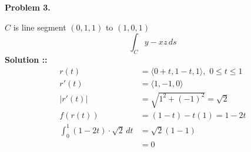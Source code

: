 \documentclass[11pt]{article}
\begin{document}

\textbf{Problem 3.}

$C$ is line segment $(0,1,1)$ to $(1,0,1)$
$$\int_C y-xz\,ds$$
\vspace{5px}\textbf{Solution ::}
\begin{align}
    r(t) &= \langle0 + t, 1-t, 1\rangle,\,\,0\le t\le 1 \\
    r'(t) &= \langle1,-1,0\rangle \\
    |r'(t)| &= \sqrt{1^2 + (-1)^2} = \sqrt{2} \\
    f(r(t)) &= (1-t)-t(1) = 1-2t \\
    \int_{0}^{1} (1-2t)\cdot \sqrt{2}\,dt &= \sqrt{2}(1-1) \\
    &= 0
\end{align}
\end{document}

